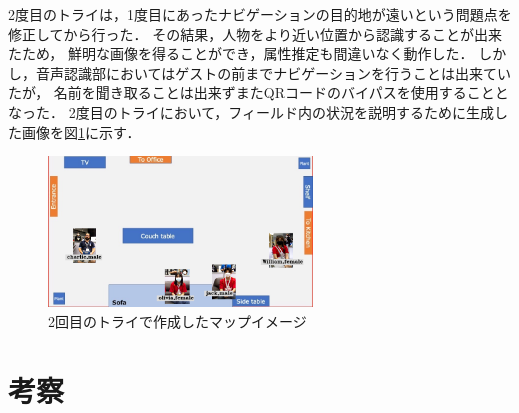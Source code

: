 \documentclass[a4j]{jarticle}
\begin{document}
2度目のトライは，1度目にあったナビゲーションの目的地が遠いという問題点を修正してから行った．
その結果，人物をより近い位置から認識することが出来たため，
鮮明な画像を得ることができ，属性推定も間違いなく動作した．
しかし，音声認識部においてはゲストの前までナビゲーションを行うことは出来ていたが，
名前を聞き取ることは出来ずまたQRコードのバイパスを使用することとなった．
2度目のトライにおいて，フィールド内の状況を説明するために生成した画像を図\ref{result_FMM_2}に示す．
\begin{figure}[ht]
  \centering
  \includegraphics[width=7cm]{images/FMM/mapimage.png}
  \caption{2回目のトライで作成したマップイメージ}
  \label{result_FMM_2}
\end{figure}



\section{考察}
\end{document}

